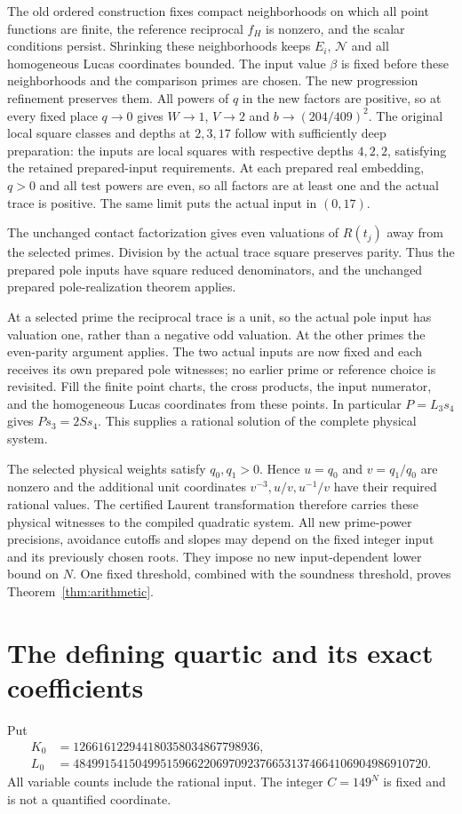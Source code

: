 \documentclass[11pt,a4paper]{article}
\begin{document}
The old ordered construction fixes compact neighborhoods on which all
point functions are finite, the reference reciprocal $f_H$ is nonzero,
and the scalar conditions persist. Shrinking these neighborhoods keeps
$E_i$, $\mathcal N$ and all homogeneous Lucas coordinates bounded.
The input value $\beta$ is fixed before these neighborhoods and the
comparison primes are chosen. The new progression refinement
preserves them. All powers of $q$ in the new factors are positive,
so at every fixed place $q\to0$ gives $W\to1$, $V\to2$ and
$b\to(204/409)^2$. The original local square classes and depths at
$2,3,17$ follow with sufficiently deep preparation: the inputs are
local squares with respective depths $4,2,2$, satisfying the retained
prepared-input requirements. At each prepared
real embedding, $q>0$ and all test powers are even, so all factors
are at least one and the actual trace is positive. The same limit
puts the actual input in $(0,17)$.

The unchanged contact factorization gives even valuations of $R(t_j)$
away from the selected primes. Division by the actual trace square preserves
parity. Thus the prepared pole inputs have square reduced denominators,
and the unchanged prepared pole-realization theorem applies.

At a selected prime the reciprocal trace is a unit, so the actual
pole input has valuation one, rather than a negative odd valuation.
At the other primes the even-parity argument applies. The two actual
inputs are now fixed and each receives its own prepared pole witnesses;
no earlier prime or reference choice is revisited. Fill the finite
point charts, the cross products, the input numerator, and the
homogeneous Lucas coordinates from these points. In particular
$P=L_3s_4$ gives $P s_3=2S s_4$. This supplies a rational solution
of the complete physical system.

The selected physical weights satisfy $q_0,q_1>0$. Hence $u=q_0$
and $v=q_1/q_0$ are nonzero and the additional unit coordinates
$v^{-3},u/v,u^{-1}/v$ have their required rational values. The
certified Laurent transformation therefore carries these physical
witnesses to the compiled quadratic system. All new prime-power
precisions, avoidance cutoffs and slopes may depend on the fixed
integer input and its previously chosen roots. They impose no new
input-dependent lower bound on $N$. One fixed threshold, combined
with the soundness threshold, proves Theorem~\ref{thm:arithmetic}.

\section{The defining quartic and its exact coefficients}\label{sec:quartic194-algebra}
Put
\[
 \begin{aligned}
 K_0&=126616122944180358034867798936,\\
 L_0&=484991541504995159662206970923766531374664106904986910720.
 \end{aligned}
\]
All variable counts include the rational input. The integer $C=149^N$ is
fixed and is not a quantified coordinate.
\end{document}
